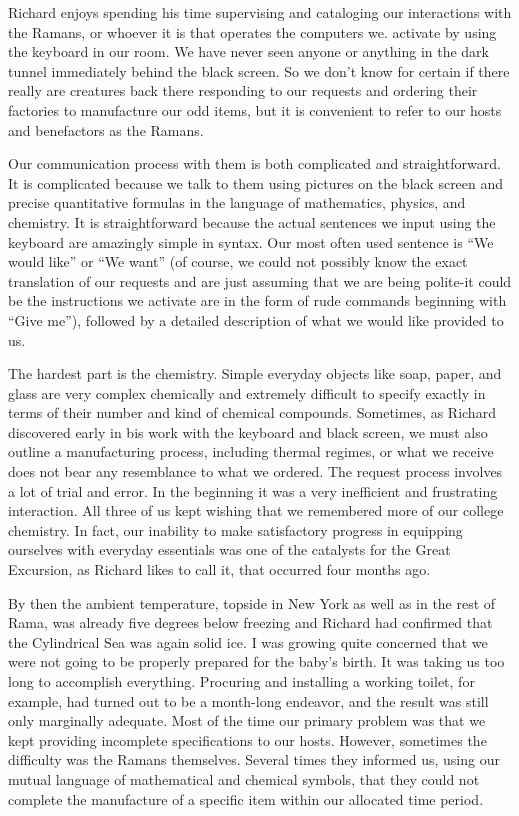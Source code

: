 \documentclass[]{article}
\begin{document}
Richard enjoys spending his time supervising and cataloging our interactions with the Ramans, or whoever it is that operates the computers we. activate by using the keyboard in our room. We have never seen anyone or anything in the dark tunnel immediately behind the black screen. So we don’t know for certain if there really are creatures back there responding to our requests and ordering their factories to manufacture our odd items, but it is convenient to refer to our hosts and benefactors as the Ramans.

Our communication process with them is both complicated and straightforward. It is complicated because we talk to them using pictures on the black screen and precise quantitative formulas in the language of mathematics, physics, and chemistry. It is straightforward because the actual sentences we input using the keyboard are amazingly simple in syntax. Our most often used sentence is “We would like” or “We want” (of course, we could not possibly know the exact translation of our requests and are just assuming that we are being polite-it could be the instructions we activate are in the form of rude commands beginning with “Give me”), followed by a detailed description of what we would like provided to us.

The hardest part is the chemistry. Simple everyday objects like soap, paper, and glass are very complex chemically and extremely difficult to specify exactly in terms of their number and kind of chemical compounds. Sometimes, as Richard discovered early in bis work with the keyboard and black screen, we must also outline a manufacturing process, including thermal regimes, or what we receive does not bear any resemblance to what we ordered. The request process involves a lot of trial and error. In the beginning it was a very inefficient and frustrating interaction. All three of us kept wishing that we remembered more of our college chemistry. In fact, our inability to make satisfactory progress in equipping ourselves with everyday essentials was one of the catalysts for the Great Excursion, as Richard likes to call it, that occurred four months ago.

By then the ambient temperature, topside in New York as well as in the rest of Rama, was already five degrees below freezing and Richard had confirmed that the Cylindrical Sea was again solid ice. I was growing quite concerned that we were not going to be properly prepared for the baby’s birth. It was taking us too long to accomplish everything. Procuring and installing a working toilet, for example, had turned out to be a month-long endeavor, and the result was still only marginally adequate. Most of the time our primary problem was that we kept providing incomplete specifications to our hosts. However, sometimes the difficulty was the Ramans themselves. Several times they informed us, using our mutual language of mathematical and chemical symbols, that they could not complete the manufacture of a specific item within our allocated time period.
\end{document}
